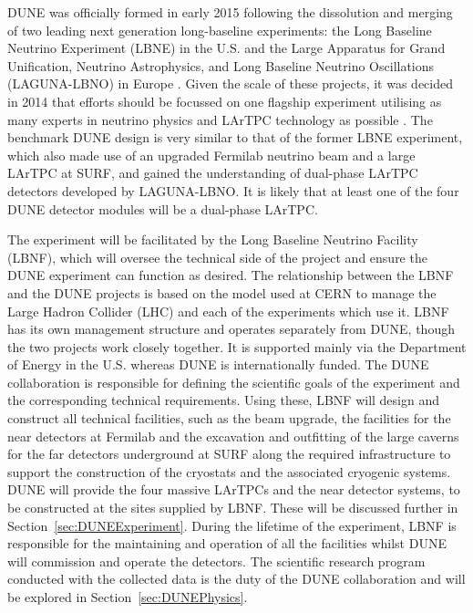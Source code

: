 DUNE was officially formed in early 2015 following the dissolution and merging of two leading next generation long-baseline experiments: the Long Baseline Neutrino Experiment (LBNE) in the U.S. \cite{LBNECDR1,LBNECDR3,LBNECDR4a} and the Large Apparatus for Grand Unification, Neutrino Astrophysics, and Long Baseline Neutrino Oscillations (LAGUNA-LBNO) in Europe \cite{LAGUNA-LBNO2015}.  Given the scale of these projects, it was decided in 2014 that efforts should be focussed on one flagship experiment utilising as many experts in neutrino physics and LArTPC technology as possible \cite{P52014}.  The benchmark DUNE design is very similar to that of the former LBNE experiment, which also made use of an upgraded Fermilab neutrino beam and a large LArTPC at SURF, and gained the understanding of dual-phase LArTPC detectors developed by LAGUNA-LBNO.  It is likely that at least one of the four DUNE detector modules will be a dual-phase LArTPC.

The experiment will be facilitated by the Long Baseline Neutrino Facility (LBNF), which will oversee the technical side of the project and ensure the DUNE experiment can function as desired.  The relationship between the LBNF and the DUNE projects is based on the model used at CERN to manage the Large Hadron Collider (LHC) and each of the experiments which use it.  LBNF has its own management structure and operates separately from DUNE, though the two projects work closely together.  It is supported mainly via the Department of Energy in the U.S. whereas DUNE is internationally funded.  The DUNE collaboration is responsible for defining the scientific goals of the experiment and the corresponding technical requirements.  Using these, LBNF will design and construct all technical facilities, such as the beam upgrade, the facilities for the near detectors at Fermilab and the excavation and outfitting of the large caverns for the far detectors underground at SURF along the required infrastructure to support the construction of the cryostats and the associated cryogenic systems.  DUNE will provide the four massive LArTPCs and the near detector systems, to be constructed at the sites supplied by LBNF.  These will be discussed further in Section~\ref{sec:DUNEExperiment}.  During the lifetime of the experiment, LBNF is responsible for the maintaining and operation of all the facilities whilst DUNE will commission and operate the detectors.  The scientific research program conducted with the collected data is the duty of the DUNE collaboration and will be explored in Section~\ref{sec:DUNEPhysics}.

